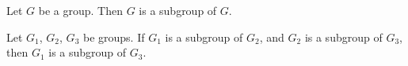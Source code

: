 \begin{theorem}
Let $G$ be a group. Then $G$ is a subgroup of $G$.
\end{theorem}

\begin{theorem}
Let $G_{1}$, $G_{2}$, $G_{3}$ be groups.
If $G_{1}$ is a subgroup of $G_{2}$, and $G_{2}$ is a subgroup of $G_{3}$,
then $G_{1}$ is a subgroup of $G_{3}$.
\end{theorem}